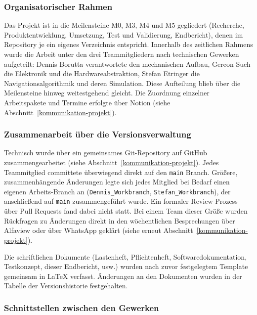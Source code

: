 
\subsubsection*{Organisatorischer Rahmen}

Das Projekt ist in die Meilensteine M0, M3, M4 und M5 gegliedert (Recherche, Produktentwicklung, Umsetzung, Test und Validierung, Endbericht), denen im Repository je ein eigenes Verzeichnis entspricht. Innerhalb des zeitlichen Rahmens wurde die Arbeit unter den drei Teammitgliedern nach technischen Gewerken aufgeteilt: Dennis Borutta verantwortete den mechanischen Aufbau, Gereon Such die Elektronik und die Hardwareabstraktion, Stefan Etringer die Navigationsalgorithmik und deren Simulation. Diese Aufteilung blieb über die Meilensteine hinweg weitestgehend gleicht. Die Zuordnung einzelner Arbeitspakete und Termine erfolgte über Notion (siehe Abschnitt~\ref{kommunikation-projekt}).

\subsubsection*{Zusammenarbeit über die Versionsverwaltung}

Technisch wurde über ein gemeinsames Git-Repository auf GitHub zusammengearbeitet (siehe Abschnitt~\ref{kommunikation-projekt}). Jedes Teammitglied committete überwiegend direkt auf den \texttt{main} Branch. Größere, zusammenhängende Änderungen legte sich jedes Mitglied bei Bedarf einen eigenen Arbeits-Branch an (\texttt{Dennis\_Workbranch}, \texttt{Stefan\_Workbranch}), der anschließend auf \texttt{main} zusammengeführt wurde. Ein formaler Review-Prozess über Pull Requests fand dabei nicht statt. Bei einem Team dieser Größe wurden Rückfragen zu Änderungen direkt in den wöchentlichen Besprechungen über Alfaview oder über WhatsApp geklärt (siehe erneut Abschnitt~\ref{kommunikation-projekt}).

Die schriftlichen Dokumente (Lastenheft, Pflichtenheft, Softwaredokumentation, Testkonzept, dieser Endbericht, usw.) wurden nach zuvor festgelegtem Template gemeinsam in \LaTeX{} verfasst. Änderungen an den Dokumenten wurden in der Tabelle  der Versionshistorie festgehalten.

\subsubsection*{Schnittstellen zwischen den Gewerken}

